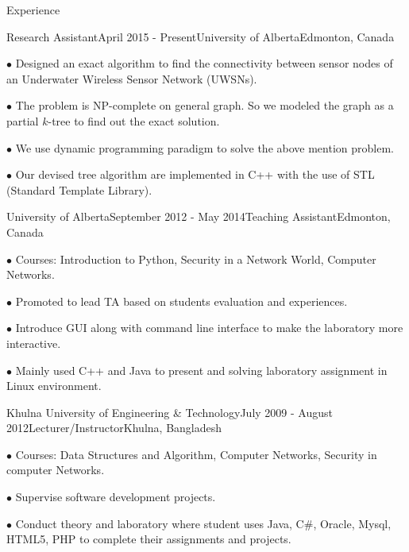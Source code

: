 \documentclass{resume} %
\begin{document}
\begin{rSection}{Experience}

\begin{rSubsection}{Research Assistant}{April 2015 - Present}{University of Alberta}{Edmonton, Canada}
\item[$\bullet$] Designed an exact algorithm to find the connectivity between sensor nodes of an Underwater Wireless Sensor Network (UWSNs).
\item[$\bullet$] The problem is NP-complete on general graph. So we modeled the graph as a partial $k$-tree to find out the exact solution.
\item[$\bullet$] We use dynamic programming paradigm to solve the above mention problem.
\item[$\bullet$] Our devised tree algorithm are implemented in C++ with the use of STL (Standard Template Library).
\end{rSubsection}



\begin{rSubsection}{University of Alberta}{September 2012 - May 2014}{Teaching Assistant}{Edmonton, Canada}
\item[$\bullet$] Courses: Introduction to Python, Security in a Network World, Computer Networks.
\item[$\bullet$] Promoted to lead TA based on students evaluation and experiences.
\item[$\bullet$] Introduce GUI along with command line interface to make the laboratory more interactive.
\item[$\bullet$] Mainly used C++ and Java to present and solving laboratory assignment in Linux environment. 
\end{rSubsection}
\begin{rSubsection}{Khulna University of Engineering \& Technology}{July 2009 - August 2012}{Lecturer/Instructor}{Khulna, Bangladesh}
\item[$\bullet$] Courses: Data Structures and Algorithm, Computer Networks, Security in computer Networks.
\item[$\bullet$] Supervise software development projects.
\item[$\bullet$] Conduct theory and laboratory where student uses Java, C$\#$, Oracle, Mysql, HTML5, PHP to complete their assignments and projects. 
\end{rSubsection}
\end{rSection}
\end{document}
